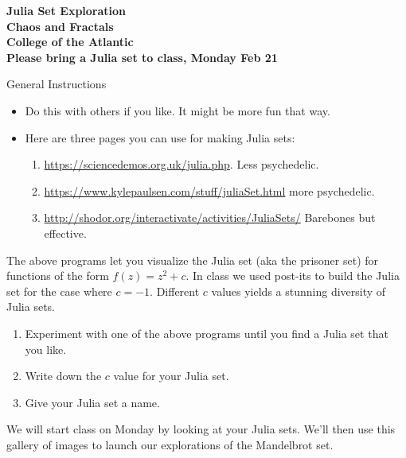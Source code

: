 \documentclass[12pt]{article}
\begin{document}
\pagestyle{empty}
 
\begin{center}
{\LARGE {\bf Julia Set Exploration}}\\
\bigskip
{\Large {\bf Chaos and Fractals}}\\
\bigskip
{\Large {\bf College of the Atlantic}}\\
\bigskip
    {{\bf Please bring a Julia set to class, Monday Feb 21}}\\
\end{center}
\medskip

\noindent General Instructions

\begin{itemize}
\setlength{\itemsep}{0mm}
\item Do this with others if you like. It might be more fun that
  way.
\item Here are three pages you can use for making Julia sets:
  \begin{enumerate}
  \item
    \href{https://sciencedemos.org.uk/julia.php}{\url{https://sciencedemos.org.uk/julia.php}}. Less
    psychedelic.
    \item
      \href{https://www.kylepaulsen.com/stuff/juliaSet.html}{\url{https://www.kylepaulsen.com/stuff/juliaSet.html}}
      more psychedelic.  

    \item
      \href{http://shodor.org/interactivate/activities/JuliaSets/}{\url{http://shodor.org/interactivate/activities/JuliaSets/}} 
      Barebones but effective.
    
\end{enumerate}
\end{itemize}


\noindent The above programs let you visualize the Julia set (aka the
prisoner set) for functions of the form $f(z) = z^2 + c$.  In class we
used post-its to build the Julia set for the case where $c=-1$.
Different $c$ values yields a stunning diversity of Julia sets.\\


\begin{enumerate}
\item Experiment with one of the above programs until you find a
  Julia set that you like.
\item Write down the $c$ value for your Julia set.
\item Give your Julia set a name.
\end{enumerate}

\noindent We will start class on Monday by looking at your Julia sets.  We'll
then use this gallery of images to launch our explorations of the
Mandelbrot set. 
\end{document}
